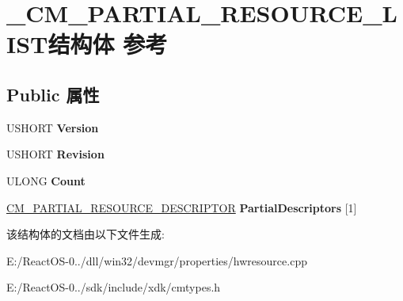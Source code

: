\hypertarget{struct___c_m___p_a_r_t_i_a_l___r_e_s_o_u_r_c_e___l_i_s_t}{}\section{\+\_\+\+C\+M\+\_\+\+P\+A\+R\+T\+I\+A\+L\+\_\+\+R\+E\+S\+O\+U\+R\+C\+E\+\_\+\+L\+I\+S\+T结构体 参考}
\label{struct___c_m___p_a_r_t_i_a_l___r_e_s_o_u_r_c_e___l_i_s_t}
\subsection*{Public 属性}
\begin{DoxyCompactItemize}
\item 
\mbox{\label{struct___c_m___p_a_r_t_i_a_l___r_e_s_o_u_r_c_e___l_i_s_t_ab94e5eced92ff46b1ec836b2b3cce47b}} 
U\+S\+H\+O\+RT {\bfseries Version}
\item 
\mbox{\label{struct___c_m___p_a_r_t_i_a_l___r_e_s_o_u_r_c_e___l_i_s_t_a8c9256f8dd3fc3ef32e3494a990fe2c6}} 
U\+S\+H\+O\+RT {\bfseries Revision}
\item 
\mbox{\label{struct___c_m___p_a_r_t_i_a_l___r_e_s_o_u_r_c_e___l_i_s_t_ad9c29c0d3cd53e09afe81bc88aa889a7}} 
U\+L\+O\+NG {\bfseries Count}
\item 
\mbox{\label{struct___c_m___p_a_r_t_i_a_l___r_e_s_o_u_r_c_e___l_i_s_t_a9a028163278a8b51af7295cbc71555d7}} 
\hyperlink{struct___c_m___p_a_r_t_i_a_l___r_e_s_o_u_r_c_e___d_e_s_c_r_i_p_t_o_r}{C\+M\+\_\+\+P\+A\+R\+T\+I\+A\+L\+\_\+\+R\+E\+S\+O\+U\+R\+C\+E\+\_\+\+D\+E\+S\+C\+R\+I\+P\+T\+OR} {\bfseries Partial\+Descriptors} \mbox{[}1\mbox{]}
\end{DoxyCompactItemize}


该结构体的文档由以下文件生成\+:\begin{DoxyCompactItemize}
\item 
E\+:/\+React\+O\+S-\/0../dll/win32/devmgr/properties/hwresource.\+cpp\item 
E\+:/\+React\+O\+S-\/0../sdk/include/xdk/cmtypes.\+h\end{DoxyCompactItemize}
